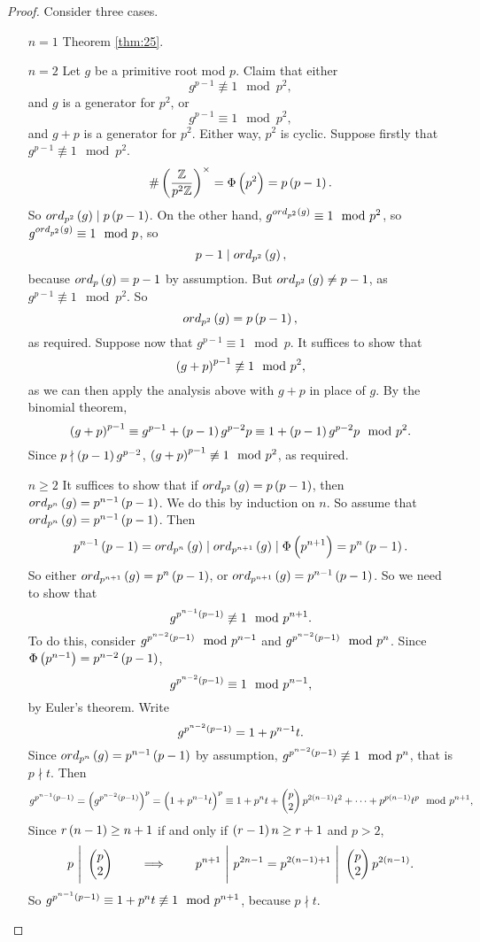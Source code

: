 \begin{proof}
Consider three cases.
\begin{itemize}[leftmargin=0.5in]
\item[$ n = 1 $] Theorem \ref{thm:25}.
\item[$ n = 2 $] Let $ g $ be a primitive root mod $ p $. Claim that either
$$ g^{p - 1} \not\equiv 1 \mod p^2, $$
and $ g $ is a generator for $ \unit{p^2} $, or
$$ g^{p - 1} \equiv 1 \mod p^2, $$
and $ g + p $ is a generator for $ \unit{p^2} $. Either way, $ \unit{p^2} $ is cyclic. Suppose firstly that $ g^{p - 1} \not\equiv 1 \mod p^2 $.
$$ \#\Unit{p^2} = \Phi\br{p^2} = p\br{p - 1}. $$
So $ ord_{p^2}\br{g} \mid p\br{p - 1} $. On the other hand, $ g^{ord_{p^2}\br{g}} \equiv 1 \mod p^2 $, so $ g^{ord_{p^2}\br{g}} \equiv 1 \mod p $, so
$$ p - 1 \mid ord_{p^2}\br{g}, $$
because $ ord_p\br{g} = p - 1 $ by assumption. But $ ord_{p^2}\br{g} \ne p - 1 $, as $ g^{p - 1} \not\equiv 1 \mod p^2 $. So
$$ ord_{p^2}\br{g} = p\br{p - 1}, $$
as required. Suppose now that $ g^{p - 1} \equiv 1 \mod p $. It suffices to show that
$$ \br{g + p}^{p - 1} \not\equiv 1 \mod p^2, $$
as we can then apply the analysis above with $ g + p $ in place of $ g $. By the binomial theorem,
$$ \br{g + p}^{p - 1} \equiv g^{p - 1} + \br{p - 1}g^{p - 2}p \equiv 1 + \br{p - 1}g^{p - 2}p \mod p^2. $$
Since $ p \nmid \br{p - 1}g^{p - 2} $, $ \br{g + p}^{p - 1} \not\equiv 1 \mod p^2 $, as required.
\item[$ n \ge 2 $] It suffices to show that if $ ord_{p^2}\br{g} = p\br{p - 1} $, then $ ord_{p^n}\br{g} = p^{n - 1}\br{p - 1} $. We do this by induction on $ n $. So assume that $ ord_{p^n}\br{g} = p^{n - 1}\br{p - 1} $. Then
$$ p^{n - 1}\br{p - 1} = ord_{p^n}\br{g} \mid ord_{p^{n + 1}}\br{g} \mid \Phi\br{p^{n + 1}} = p^n\br{p - 1}. $$
So either $ ord_{p^{n + 1}}\br{g} = p^n\br{p - 1} $, or $ ord_{p^{n + 1}}\br{g} = p^{n - 1}\br{p - 1} $. So we need to show that
$$ g^{p^{n - 1}\br{p - 1}} \not\equiv 1 \mod p^{n + 1}. $$
To do this, consider $ g^{p^{n - 2}\br{p - 1}} \mod p^{n - 1} $ and $ g^{p^{n - 2}\br{p - 1}} \mod p^n $. Since $ \Phi\br{p^{n - 1}} = p^{n - 2}\br{p - 1} $,
$$ g^{p^{n - 2}\br{p - 1}} \equiv 1 \mod p^{n - 1}, $$
by Euler's theorem. Write
$$ g^{p^{n - 2}\br{p - 1}} = 1 + p^{n - 1}t. $$
Since $ ord_{p^n}\br{g} = p^{n - 1}\br{p - 1} $ by assumption, $ g^{p^{n - 2}\br{p - 1}} \not\equiv 1 \mod p^n $, that is $ p \nmid t $. Then
$$ g^{p^{n - 1}\br{p - 1}} = \br{g^{p^{n - 2}\br{p - 1}}}^p = \br{1 + p^{n - 1}t}^p \equiv 1 + p^nt + \twobyone{p}{2}p^{2\br{n - 1}}t^2 + \dots + p^{p\br{n - 1}}t^p \mod p^{n + 1}, $$
Since $ r\br{n - 1} \ge n + 1 $ if and only if $ \br{r - 1}n \ge r + 1 $ and $ p > 2 $,
$$ p \ \Bigg| \ \twobyone{p}{2} \qquad \implies \qquad p^{n + 1} \ \Bigg| \ p^{2n - 1} = p^{2\br{n - 1} + 1} \ \Bigg| \ \twobyone{p}{2}p^{2\br{n - 1}}. $$
So $ g^{p^{n - 1}\br{p - 1}} \equiv 1 + p^nt \not\equiv 1 \mod p^{n + 1} $, because $ p \nmid t $.
\end{itemize}
\end{proof}

